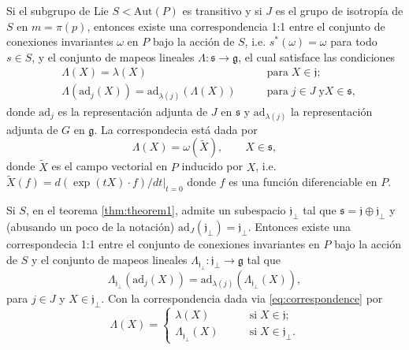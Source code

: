 \begin{thm}
\label{thm:theorem1}
Si el subgrupo de Lie $S < \mathrm{Aut} (P)$ es transitivo y si $J$ es el grupo de isotrop\'{i}a de $S$ en $m = \pi(p)$, entonces existe una correspondencia 1:1 entre el conjunto de conexiones invariantes $\omega$ en $P$ bajo la acci\'{o}n de $S$, i.e. $s^{*}(\omega) = \omega$ para todo $s \in S$, y el conjunto de mapeos lineales $\Lambda: \mathfrak{s} \longrightarrow \mathfrak{g}$, el cual satisface las condiciones
%
\begin{align}
\label{eq:LambdaCond1}
& \Lambda (X) = \lambda (X) & \mathrm{para} \; X\in \mathfrak{j}; \\
\label{eq:LambdaCond2}
& \Lambda (\mathrm{ad}_{j} (X)) = \mathrm{ad}_{\lambda (j)} (\Lambda (X)) \qquad & \mathrm{para} \; j \in J \; \mathrm{y} X \in \mathfrak{s},
\end{align}
%
donde $\mathrm{ad}_{j}$ es la representaci\'{o}n adjunta de $J$ en $\mathfrak{s}$ y $\mathrm{ad}_{\lambda (j)}$ la representaci\'{o}n adjunta de $G$ en $\mathfrak{g}$. La correspondecia est\'{a} dada por
%
\begin{equation}
\label{eq:correspondence}
\Lambda (X) = \omega (\tilde{X}), \qquad X \in \mathfrak{s},
\end{equation}
%
donde $\tilde{X}$ es el campo vectorial en $P$ inducido por $X$, i.e. $\tilde{X}(f) = d(\exp(t X) \cdot f)/dt \vert_{t=0}$ donde $f$ es una funci\'{o}n diferenciable en $P$.
\end{thm}

\begin{thm}
Si $S$, en el teorema \ref{thm:theorem1}, admite un subespacio $\mathfrak{j}_{\perp}$ tal que $\mathfrak{s} = \mathfrak{j} \oplus \mathfrak{j}_{\perp}$ y (abusando un poco de la notaci\'{o}n) $\mathrm{ad}_{J} (\mathfrak{j}_{\perp}) = \mathfrak{j}_{\perp}$. Entonces existe una correspondecia 1:1 entre el conjunto de conexiones invariantes en $P$ bajo la acci\'{o}n de $S$ y el conjunto de mapeos lineales $\Lambda_{\mathfrak{j}_{\perp}}: \mathfrak{j}_{\perp} \longrightarrow \mathfrak{g}$ tal que
%
\begin{equation}
\label{eq:HiggsField}
\Lambda_{\mathfrak{j}_{\perp}} (\mathrm{ad}_{j} (X)) = \mathrm{ad}_{\lambda (j)} (\Lambda_{\mathfrak{j}_{\perp}} (X)),
\end{equation}
%
para $j \in J$ y $X \in \mathfrak{j}_{\perp}$. Con la correspondencia dada via \eqref{eq:correspondence} por
%
$$
\Lambda (X) = 
\begin{cases}
\lambda (X) \qquad & \mathrm{si} \; X\in \mathfrak{j}; \\
\Lambda_{\mathfrak{j}_{\perp}} (X) \qquad & \mathrm{si} \; X \in \mathfrak{j}_{\perp}.
\end{cases}
$$
%
\end{thm}


